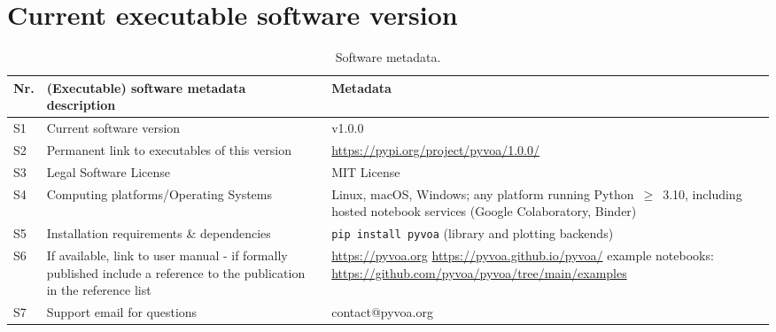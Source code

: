 \documentclass[preprint,12pt,a4paper]{elsarticle}
\begin{document}


\renewcommand{\bibfont}{\raggedright}


  \section*{Current executable software version}

  \begin{table}[!ht]
  \small
  \begin{tabular}{|l|>{\raggedright\arraybackslash}p{5.0cm}|>{\raggedright\arraybackslash}p{6.7cm}|}
  \hline
  \textbf{Nr.} & \textbf{(Executable) software metadata description} & \textbf{Metadata} \\
  \hline
  S1 & Current software version & v1.0.0 \\
  \hline
  S2 & Permanent link to executables of this version &
  \url{https://pypi.org/project/pyvoa/1.0.0/} \\
  \hline
  S3 & Legal Software License & MIT License \\
  \hline
  S4 & Computing platforms/Operating Systems & Linux, macOS, Windows;
  any platform running Python~$\geq$~3.10, including hosted notebook services
  (Google Colaboratory, Binder) \\
  \hline
  S5 & Installation requirements \& dependencies &
  \texttt{pip install pyvoa} (library and plotting backends) \\
  \hline
  S6 & If available, link to user manual - if formally published include a
  reference to the publication in the reference list &
  \url{https://pyvoa.org} \newline
  \url{https://pyvoa.github.io/pyvoa/} \newline
  example notebooks: \url{https://github.com/pyvoa/pyvoa/tree/main/examples} \\
  \hline
  S7 & Support email for questions & contact@pyvoa.org \\
  \hline
  \end{tabular}
  \caption{Software metadata.}
  \label{executableMetadata}
  \end{table}
\end{document}
